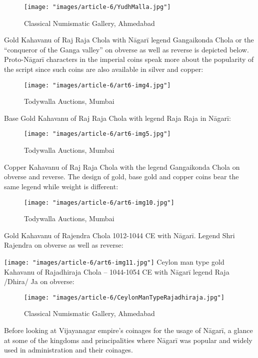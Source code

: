 \begin{figure}
\texttt{[image: "images/article-6/YudhMalla.jpg"]}
\caption{Classical Numismatic Gallery, Ahmedabad}
\end{figure}

Gold Kahavanu of Raj Raja Chola with Nāgarī legend Gangaikonda Chola or the “conqueror of the Ganga valley” on obverse as well as reverse is depicted below. Proto-Nāgarī characters in the imperial coins speak more about the popularity of the script since such coins are also available in silver and copper:

\begin{figure}
\texttt{[image: "images/article-6/art6-img4.jpg"]}
\caption{Todywalla Auctions, Mumbai}
\end{figure}

Base Gold Kahavanu of Raj Raja Chola with legend Raja Raja in Nāgarī:

\begin{figure}
\texttt{[image: "images/article-6/art6-img5.jpg"]}
\caption{Todywalla Auctions, Mumbai}
\end{figure}

Copper Kahavanu of Raj Raja Chola with the legend Gangaikonda Chola on obverse and reverse. The design of gold, base gold and copper coins bear the same legend while weight is different:

\begin{figure}
\texttt{[image: "images/article-6/art6-img10.jpg"]}
\caption{Todywalla Auctions, Mumbai}
\end{figure}

Gold Kahavanu of Rajendra Chola 1012-1044 CE with Nāgarī. Legend Shri Rajendra on obverse as well as reverse:

\texttt{[image: "images/article-6/art6-img11.jpg"]}
Ceylon man type gold Kahavanu of Rajadhiraja Chola – 1044-1054 CE with Nāgarī legend Raja /Dhira/ Ja on obverse:

\begin{figure}
\texttt{[image: "images/article-6/CeylonManTypeRajadhiraja.jpg"]}
\caption{Classical Numismatic Gallery, Ahmedabad}
\end{figure}

Before looking at Vijayanagar empire’s coinages for the usage of Nāgarī, a glance at some of the kingdoms and principalities where Nāgarī was popular and widely used in administration and their coinages.


